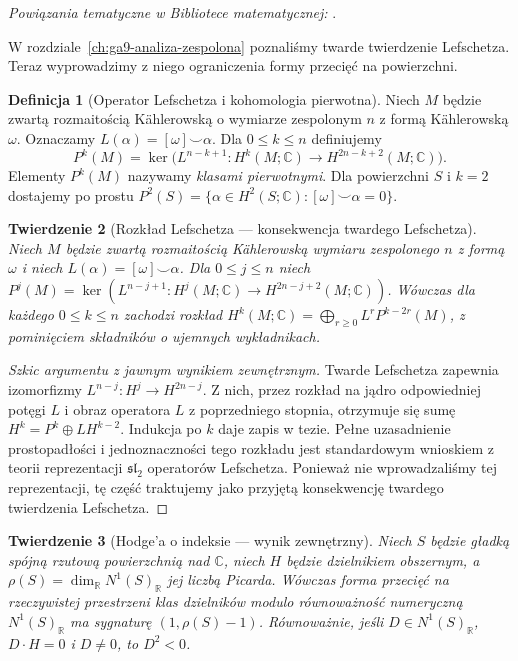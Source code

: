 \documentclass[11pt,a4paper,openany]{report}
\numberwithin{equation}{section}
\theoremstyle{plain}
\newtheorem{twierdzenie}{Twierdzenie}[section]
\theoremstyle{definition}
\newtheorem{definicja}[twierdzenie]{Definicja}
\theoremstyle{remark}
\newcommand{\R}{\mathbb R}
\newcommand{\C}{\mathbb C}
\begin{document}
\noindent\emph{Powiązania tematyczne w Bibliotece matematycznej:} .


W rozdziale~\ref{ch:ga9-analiza-zespolona} poznaliśmy
twarde twierdzenie Lefschetza. Teraz wyprowadzimy z niego
ograniczenia formy przecięć na powierzchni.

\begin{definicja}[Operator Lefschetza i kohomologia pierwotna]
Niech $M$ będzie zwartą rozmaitością Kählerowską
o wymiarze zespolonym $n$ z formą Kählerowską $\omega$.
Oznaczamy $L(\alpha)=[\omega]\smile\alpha$.
Dla $0\le k\le n$ definiujemy
\[
 P^k(M)=\ker\bigl(L^{n-k+1}\colon
 H^k(M;\C)\to H^{2n-k+2}(M;\C)\bigr).
\]
Elementy $P^k(M)$ nazywamy \emph{klasami pierwotnymi}.
Dla powierzchni $S$ i $k=2$ dostajemy po prostu
$P^2(S)=\{\alpha\in H^2(S;\C):[\omega]\smile\alpha=0\}$.
\end{definicja}

\begin{twierdzenie}[Rozkład Lefschetza — konsekwencja twardego Lefschetza]
Niech $M$ będzie zwartą rozmaitością Kählerowską wymiaru
zespolonego $n$ z formą $\omega$ i niech
$L(\alpha)=[\omega]\smile\alpha$. Dla $0\le j\le n$
niech $P^j(M)=\ker(L^{n-j+1}:H^j(M;\C)\to
H^{2n-j+2}(M;\C))$. Wówczas dla każdego $0\le k\le n$
zachodzi rozkład
$H^k(M;\C)=\bigoplus_{r\ge0}L^rP^{k-2r}(M)$,
z pominięciem składników o ujemnych wykładnikach.
\end{twierdzenie}
\begin{proof}[Szkic argumentu z jawnym wynikiem zewnętrznym]
Twarde Lefschetza zapewnia izomorfizmy
$L^{n-j}\colon H^j\to H^{2n-j}$.
Z nich, przez rozkład na jądro odpowiedniej potęgi $L$
i obraz operatora $L$ z poprzedniego stopnia,
otrzymuje się sumę $H^k=P^k\oplus LH^{k-2}$.
Indukcja po $k$ daje zapis w tezie. Pełne uzasadnienie
prostopadłości i jednoznaczności tego rozkładu jest
standardowym wnioskiem z teorii reprezentacji $\mathfrak{sl}_2$
operatorów Lefschetza. Ponieważ nie wprowadzaliśmy tej
reprezentacji, tę część traktujemy jako przyjętą
konsekwencję twardego twierdzenia Lefschetza.
\end{proof}

\begin{twierdzenie}[Hodge'a o indeksie — wynik zewnętrzny]
\label{tw:ga10-index}
Niech $S$ będzie gładką spójną rzutową powierzchnią
nad $\C$, niech $H$ będzie dzielnikiem obszernym, a
$\rho(S)=\dim_{\R}N^1(S)_{\R}$ jej liczbą Picarda.
Wówczas forma przecięć na rzeczywistej przestrzeni klas
dzielników modulo równoważność numeryczną
$N^1(S)_{\R}$ ma sygnaturę $(1,\rho(S)-1)$.
Równoważnie, jeśli $D\in N^1(S)_{\R}$,
$D\cdot H=0$ i $D\ne0$, to $D^2<0$.
\end{twierdzenie}
\end{document}
